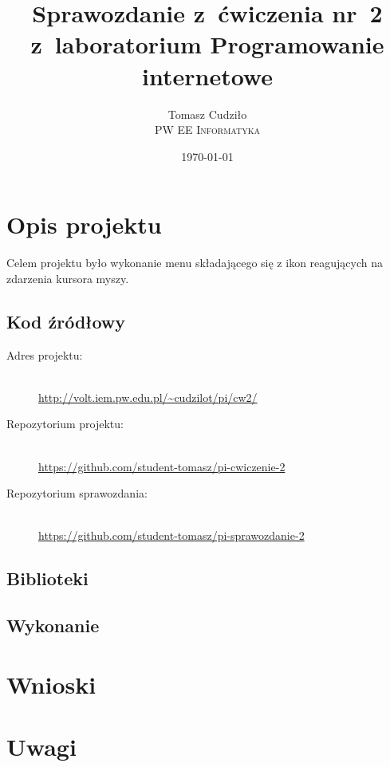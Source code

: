 \documentclass[10pt,a4paper]{article}
\begin{document}
\title{
  Sprawozdanie z~ćwiczenia nr~2\\z~laboratorium Programowanie internetowe
}
\author{
  Tomasz Cudziło\\
  \textsc{PW EE Informatyka}\\[10pt]
}
\date{\today}
\maketitle



\section{Opis projektu}

Celem projektu było wykonanie menu składającego się z ikon reagujących na
zdarzenia kursora myszy.

\subsection{Kod źródłowy}
\begin{description}
  \item[Adres projektu:] \hfill \\
  \url{http://volt.iem.pw.edu.pl/~cudzilot/pi/cw2/}
  \item[Repozytorium projektu:] \hfill \\
  \url{https://github.com/student-tomasz/pi-cwiczenie-2}
  \item[Repozytorium sprawozdania:] \hfill \\
  \url{https://github.com/student-tomasz/pi-sprawozdanie-2}
\end{description}

\subsection{Biblioteki}

\subsection{Wykonanie}



\section{Wnioski}



\section{Uwagi}
\end{document}

